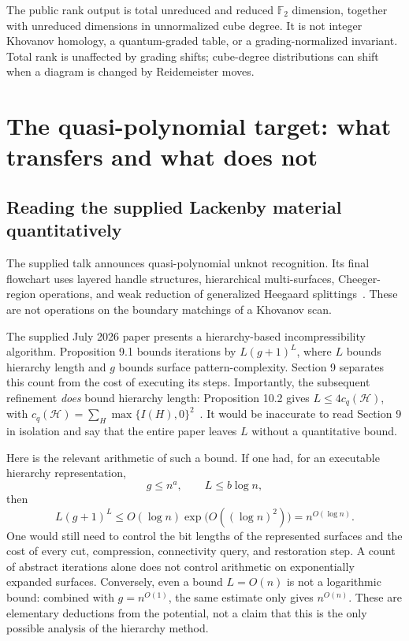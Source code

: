 \documentclass[11pt]{article}
\newcommand{\F}{\mathbb F}
\begin{document}
The public rank output is total unreduced and reduced $\F_2$ dimension, together
with unreduced dimensions in unnormalized cube degree. It is not integer
Khovanov homology, a quantum-graded table, or a grading-normalized invariant.
Total rank is unaffected by grading shifts; cube-degree distributions can shift
when a diagram is changed by Reidemeister moves.

\section{The quasi-polynomial target: what transfers and what does not}

\subsection{Reading the supplied Lackenby material quantitatively}

The supplied talk announces quasi-polynomial unknot recognition. Its final
flowchart uses layered handle structures, hierarchical multi-surfaces,
Cheeger-region operations, and weak reduction of generalized Heegaard
splittings~\cite{lackenbytalk}. These are not operations on the boundary
matchings of a Khovanov scan.

The supplied July 2026 paper presents a hierarchy-based incompressibility
algorithm. Proposition 9.1 bounds iterations by $L(g+1)^L$, where $L$ bounds
hierarchy length and $g$ bounds surface pattern-complexity. Section 9 separates
this count from the cost of executing its steps. Importantly, the subsequent
refinement \emph{does} bound hierarchy length: Proposition 10.2 gives
$L\leq4c_q(\mathcal H)$, with
$c_q(\mathcal H)=\sum_H\max\{I(H),0\}^2$~\cite{lackenby2026}.
It would be inaccurate to read Section 9 in isolation and say that the entire
paper leaves $L$ without a quantitative bound.

Here is the relevant arithmetic of such a bound. If one had, for an executable
hierarchy representation,
\[
 g\leq n^a,\qquad L\leq b\log n,
\]
then
\[
 L(g+1)^L
 \leq O(\log n)\exp\bigl(O((\log n)^2)\bigr)
 =n^{O(\log n)}.
\]
One would still need to control the bit lengths of the represented surfaces
and the cost of every cut, compression, connectivity query, and restoration
step. A count of abstract iterations alone does not control arithmetic on
exponentially expanded surfaces. Conversely, even a bound $L=O(n)$ is not a
logarithmic bound: combined with $g=n^{O(1)}$, the same estimate only gives
$n^{O(n)}$. These are elementary deductions from the potential, not a claim
that this is the only possible analysis of the hierarchy method.
\end{document}
